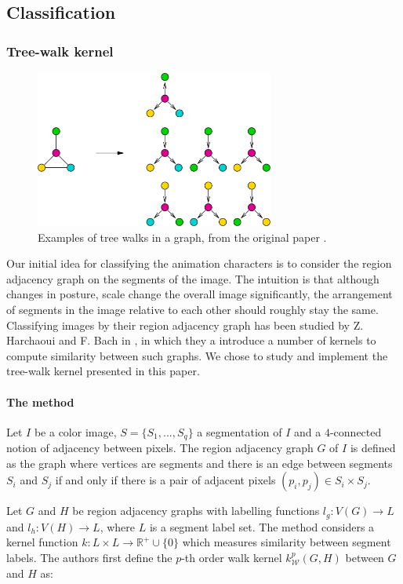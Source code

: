 \subsection{Classification}
\subsubsection{Tree-walk kernel}

\begin{figure}[htb!]
\centering
\includegraphics[width=0.7\textwidth]{images/treewalk.png}
\caption{Examples of tree walks in a graph, from the original paper \cite{harchaoui2007image}.}
\end{figure}

Our initial idea for classifying the animation characters is to consider the region adjacency graph on the segments of the image. The intuition is that although changes in posture, scale change the overall image significantly, the arrangement of segments in the image relative to each other should roughly stay the same. Classifying images by their region adjacency graph has been studied by Z. Harchaoui and F. Bach in \cite{harchaoui2007image}, in which they a introduce a number of kernels to compute similarity between such graphs. We chose to study and implement the tree-walk kernel presented in this paper.

\paragraph{The method} Let $I$ be a color image, $S = \{S_1, ..., S_q\}$ a segmentation of $I$ and a $4$-connected notion of adjacency between pixels. The region adjacency graph $G$ of $I$ is defined as the graph where vertices are segments and there is an edge between segments $S_i$ and $S_j$ if and only if there is a pair of adjacent pixels $(p_i, p_j) \in S_i \times S_j$.

Let $G$ and $H$ be region adjacency graphs with labelling functions $l_g : V(G) \rightarrow L$ and $l_h : V(H) \rightarrow L$, where $L$ is a segment label set. The method considers a kernel function $k : L \times L \rightarrow \mathbb{R}^+ \cup \{0\}$ which measures similarity between segment labels. The authors first define the $p$-th order walk kernel $k_{\mathcal{W}}^p(G,H)$ between $G$ and $H$ as:

